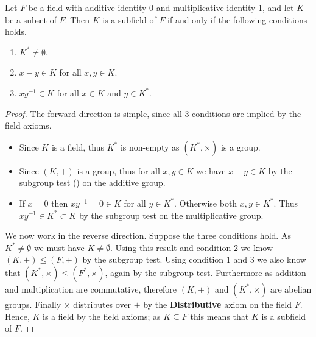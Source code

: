 \begin{theorem}\label{thrm-subfield-test}
    Let $F$ be a field with additive identity 0 and multiplicative identity 1, and let $K$ be a subset of $F$. Then $K$ is a subfield of $F$ if and only if the following conditions holds.
    \begin{enumerate}
        \item $K^\ast \neq \emptyset$.
        \item $x - y \in K$ for all $x, y \in K$.
        \item $xy^{-1} \in K$ for all $x \in K$ and $y \in K^\ast$.
    \end{enumerate}
\end{theorem}
\begin{proof}
    The forward direction is simple, since all 3 conditions are implied by the field axioms.
    \begin{itemize}
        \item Since $K$ is a field, thus $K^\ast$ is non-empty as $(K^\ast, \times)$ is a group.
        \item Since $(K, +)$ is a group, thus for all $x, y \in K$ we have $x - y \in K$ by the subgroup test () on the additive group.
        \item If $x = 0$ then $xy^{-1} = 0 \in K$ for all $y \in K^\ast$. Otherwise both $x, y \in K^\ast$. Thus $xy^{-1} \in K^\ast \subset K$ by the subgroup test on the multiplicative group.
    \end{itemize}

    We now work in the reverse direction. Suppose the three conditions hold. As $K^\ast \neq \emptyset$ we must have $K \neq \emptyset$. Using this result and condition 2 we know $(K, +) \leq (F, +)$ by the subgroup test. Using condition 1 and 3 we also know that $(K^\ast, \times) \leq (F^\ast, \times)$, again by the subgroup test. Furthermore as addition and multiplication are commutative, therefore $(K, +)$ and $(K^\ast, \times)$ are abelian groups. Finally $\times$ distributes over $+$ by the \textbf{Distributive} axiom on the field $F$. Hence, $K$ is a field by the field axioms; as $K \subseteq F$ this means that $K$ is a subfield of $F$.
\end{proof}


